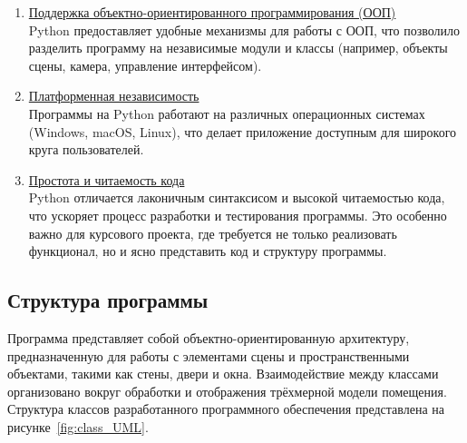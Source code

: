 \begin{enumerate}
    \item \underline{Поддержка объектно-ориентированного программирования (ООП)}\\ 
    Python предоставляет удобные механизмы для работы с ООП, что позволило разделить программу на независимые модули и классы (например, объекты сцены, камера, управление интерфейсом).

    \item \underline{Платформенная независимость}\\ 
    Программы на Python работают на различных операционных системах (Windows, macOS, Linux), что делает приложение доступным для широкого круга пользователей.

    \item \underline{Простота и читаемость кода}\\
    Python отличается лаконичным синтаксисом и высокой читаемостью кода, что ускоряет процесс разработки и тестирования программы. Это особенно важно для курсового проекта, где требуется не только реализовать функционал, но и ясно представить код и структуру программы.
\end{enumerate}



\subsection{Структура программы}

\hspace{1.25cm}
Программа представляет собой объектно-ориентированную архитектуру, предназначенную для работы с элементами сцены и пространственными объектами, такими как стены, двери и окна. Взаимодействие между классами организовано вокруг обработки и отображения трёхмерной модели помещения. Структура классов разработанного программного обеспечения представлена на рисунке~\ref{fig:class_UML}.

